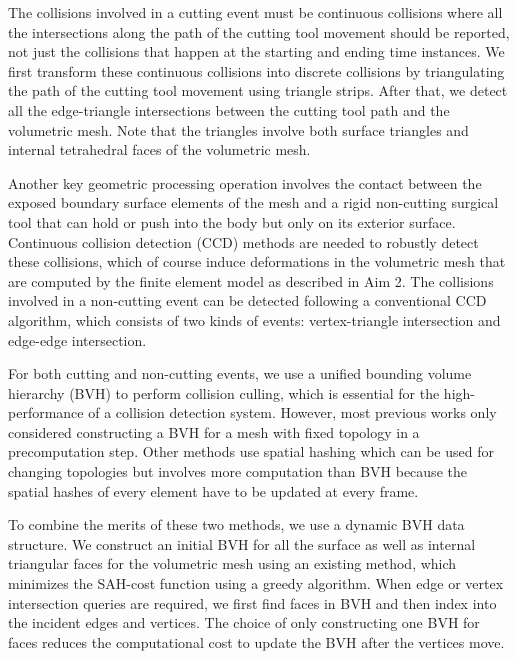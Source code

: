 The collisions involved in a cutting event must be continuous collisions where all the intersections along the path of the cutting tool movement should be reported, not just the collisions that happen at the starting and ending time instances. We first transform these continuous collisions into discrete collisions by triangulating the path of the cutting tool movement using triangle strips. After that, we detect all the edge-triangle intersections between the cutting tool path and the volumetric mesh. Note that the triangles involve both surface triangles and internal tetrahedral faces of the volumetric mesh.

Another key geometric processing operation involves the contact between the exposed boundary surface elements of the mesh and a rigid non-cutting surgical tool that can hold or push into the body but only on its exterior surface. Continuous collision detection (CCD) methods are needed to robustly detect these collisions, which of course induce deformations in the volumetric mesh that are computed by the finite element model as described in Aim 2. The collisions involved in a non-cutting event can be detected following a conventional CCD algorithm, which consists of two kinds of events: vertex-triangle intersection and edge-edge intersection.

For both cutting and non-cutting events, we use a unified bounding volume hierarchy (BVH) to perform collision culling, which is essential for the high-performance of a collision detection system. However, most previous works only considered constructing a BVH for a mesh with fixed topology in a precomputation step. Other methods use spatial hashing which can be used for changing topologies but involves more computation than BVH because the spatial hashes of every element have to be updated at every frame.

To combine the merits of these two methods, we use a dynamic BVH data structure. We construct an initial BVH for all the surface as well as internal triangular faces for the volumetric mesh using an existing method, which minimizes the SAH-cost function using a greedy algorithm. When edge or vertex intersection queries are required, we first find faces in BVH and then index into the incident edges and vertices. The choice of only constructing one BVH for faces reduces the computational cost to update the BVH after the vertices move.

